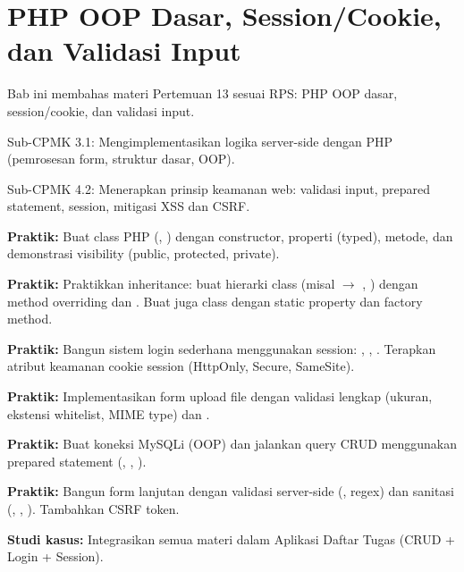 \documentclass[../main.tex]{subfiles}
\begin{document}
\chapter{PHP OOP Dasar, Session/Cookie, dan Validasi Input}

Bab ini membahas materi Pertemuan 13 sesuai RPS: PHP OOP dasar, session/cookie, dan validasi input.

\begin{subcpmk}
  \item Sub-CPMK 3.1: Mengimplementasikan logika server-side dengan PHP (pemrosesan form, struktur dasar, OOP).
  \item Sub-CPMK 4.2: Menerapkan prinsip keamanan web: validasi input, prepared statement, session, mitigasi XSS dan CSRF.
\end{subcpmk}
















\begin{aktivitas}
  \item \textbf{Praktik:} Buat class PHP (, ) dengan constructor, properti (typed), metode, dan demonstrasi visibility (public, protected, private).
  \item \textbf{Praktik:} Praktikkan inheritance: buat hierarki class (misal  $\to$ , ) dengan method overriding dan . Buat juga class dengan static property dan factory method.
  \item \textbf{Praktik:} Bangun sistem login sederhana menggunakan session: , , . Terapkan atribut keamanan cookie session (HttpOnly, Secure, SameSite).
  \item \textbf{Praktik:} Implementasikan form upload file dengan validasi lengkap (ukuran, ekstensi whitelist, MIME type) dan .
  \item \textbf{Praktik:} Buat koneksi MySQLi (OOP) dan jalankan query CRUD menggunakan prepared statement (, , ).
  \item \textbf{Praktik:} Bangun form lanjutan dengan validasi server-side (, regex) dan sanitasi (, , ). Tambahkan CSRF token.
  \item \textbf{Studi kasus:} Integrasikan semua materi dalam Aplikasi Daftar Tugas (CRUD + Login + Session).
\end{aktivitas}
\end{document}
